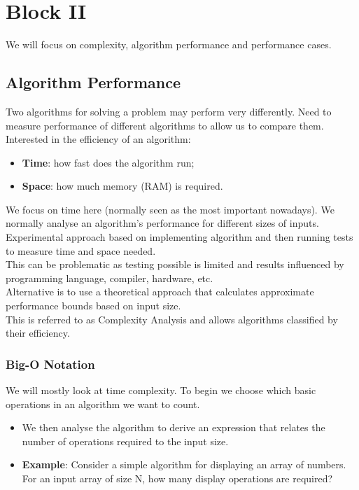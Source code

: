\documentclass[a4paper,12pt]{article}
\begin{document}
\newpage

\section{Block II}

We will focus on complexity, algorithm performance and performance cases.

\subsection{Algorithm Performance}

Two algorithms for solving a problem may perform very differently. Need to measure performance of different algorithms to
allow us to compare them.\\
Interested in the efficiency of an algorithm:
\begin{itemize}
    \item \textbf{Time}: how fast does the algorithm run;
    \item \textbf{Space}: how much memory (RAM) is required.
\end{itemize}

We focus on time here (normally seen as the most important nowadays). We normally analyse an algorithm’s performance for different sizes of inputs.\\

Experimental approach based on implementing algorithm and then running tests to measure time and space needed.\\
This can be problematic as testing possible is limited and results influenced by programming language, compiler, hardware, etc.\\
Alternative is to use a theoretical approach that calculates approximate performance bounds based on input size.\\
This is referred to as Complexity Analysis and allows algorithms classified by their efficiency.\\

\subsubsection{Big-O Notation}

We will mostly look at time complexity. To begin we choose which basic operations in an algorithm we want to count.
\begin{itemize}
    \item We then analyse the algorithm to derive an expression that relates the number of operations required to the input size.
    \item \textbf{Example}: Consider a simple algorithm for displaying an array of numbers. For an input array of size N, how many display operations are required?
\end{itemize}
\end{document}

